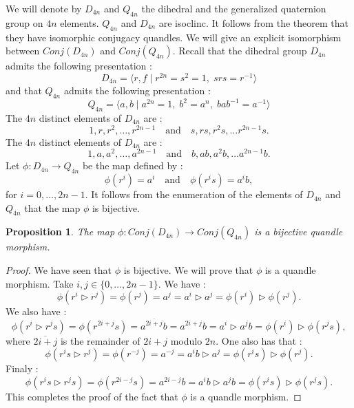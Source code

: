 \documentclass[12pt, reqno]{amsart}
\newtheorem{proposition}[theorem]{Proposition}
\begin{document}
We will denote by $D_{4n}$ and $Q_{4n}$ the dihedral and the generalized quaternion group on $4n$ elements. $Q_{4n}$ and $D_{4n}$ are isoclinc. It follows from the theorem that they have isomorphic conjugacy quandles. We will give an explicit isomorphism between $Conj(D_{4n})$ and $Conj(Q_{4n})$.
Recall that the dihedral group $D_{4n}$ admits the following presentation :
\[ D_{4n} = \langle r, f \mid r^{2n} = s^2 = 1, \; srs = r^{-1} \rangle \]
and that $Q_{4n}$ admits the following presentation : 
\[ Q_{4n} = \langle a, b \mid a^{2n} = 1, \; b^2 = a^n, \; bab^{-1} = a^{-1} \rangle \]
The $4n$ distinct elements of $D_{4n}$ are : $$1,r,r^2,\dots,r^{2n-1} \quad \text{and} \quad s,rs,r^2s,\dots r^{2n-1}s.$$
The $4n$ distinct elements of $D_{4n}$ are : $$1,a,a^2,\dots,a^{2n-1} \quad \text{and} \quad b,ab,a^2b,\dots a^{2n-1}b.$$
Let $\phi :D_{4n} \to Q_{4n}$ be the map defined by :
$$\phi(r^i)=a^i \quad \text{and} \quad \phi(r^is)=a^ib,$$
for $i=0,\dots,2n-1$. It follows from the enumeration of the elements of $D_{4n}$ and $Q_{4n}$ that the map $\phi$ is bijective. 
\begin{proposition}
The map $\phi :Conj(D_{4n}) \to Conj(Q_{4n})$ is a bijective quandle morphism.
\end{proposition}
\begin{proof}We have seen that $\phi$ is bijective.  We will prove that $\phi$ is a quandle morphism. Take $i,j \in \{ 0,\dots,2n-1\}$. We have :
$$\phi(r^i\triangleright r^j)=\phi(r^j)=a^j=a^i\triangleright a^j=\phi(r^i)\triangleright \phi(r^j).$$
We also have :
$$\phi(r^i\triangleright r^js)=\phi(r^{2i+j}s)=a^{\overline{2i+j}}b=a^{2i+j}b=a^i\triangleright a^jb=\phi(r^i)\triangleright \phi(r^js),$$
where $\overline{2i+j}$ is the remainder of $2i+j$ modulo $2n$.
One also has that : 
$$\phi(r^is\triangleright r^j)=\phi(r^{-j})=a^{-j}=a^ib\triangleright a^j=\phi(r^is)\triangleright \phi(r^j).$$
Finaly :
$$\phi(r^is\triangleright r^js)=\phi(r^{2i-j}s)=a^{2i-j}b=a^ib\triangleright a^jb=\phi(r^is)\triangleright \phi(r^js).$$
This completes the proof of the fact that $\phi$ is a quandle morphism.
\end{proof}
\end{document}
